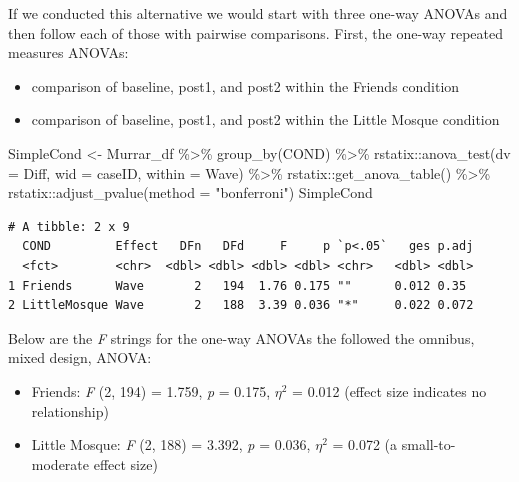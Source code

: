 \documentclass[
  11pt,
]{book}
\newenvironment{Shaded}{\begin{snugshade}}{\end{snugshade}}
\newcommand{\AttributeTok}[1]{\textcolor[rgb]{0.77,0.63,0.00}{#1}}
\newcommand{\FunctionTok}[1]{\textcolor[rgb]{0.00,0.00,0.00}{#1}}
\newcommand{\NormalTok}[1]{#1}
\newcommand{\OtherTok}[1]{\textcolor[rgb]{0.56,0.35,0.01}{#1}}
\newcommand{\SpecialCharTok}[1]{\textcolor[rgb]{0.00,0.00,0.00}{#1}}
\newcommand{\StringTok}[1]{\textcolor[rgb]{0.31,0.60,0.02}{#1}}
\providecommand{\tightlist}{%
  \setlength{\itemsep}{0pt}\setlength{\parskip}{0pt}}
\begin{document}
If we conducted this alternative we would start with three one-way ANOVAs and then follow each of those with pairwise comparisons. First, the one-way repeated measures ANOVAs:

\begin{itemize}
\tightlist
\item
  comparison of baseline, post1, and post2 within the Friends condition
\item
  comparison of baseline, post1, and post2 within the Little Mosque condition
\end{itemize}

\begin{Shaded}
\begin{Highlighting}[]
\NormalTok{SimpleCond }\OtherTok{\textless{}{-}}\NormalTok{ Murrar\_df }\SpecialCharTok{\%\textgreater{}\%}
    \FunctionTok{group\_by}\NormalTok{(COND) }\SpecialCharTok{\%\textgreater{}\%}
\NormalTok{    rstatix}\SpecialCharTok{::}\FunctionTok{anova\_test}\NormalTok{(}\AttributeTok{dv =}\NormalTok{ Diff, }\AttributeTok{wid =}\NormalTok{ caseID, }\AttributeTok{within =}\NormalTok{ Wave) }\SpecialCharTok{\%\textgreater{}\%}
\NormalTok{    rstatix}\SpecialCharTok{::}\FunctionTok{get\_anova\_table}\NormalTok{() }\SpecialCharTok{\%\textgreater{}\%}
\NormalTok{    rstatix}\SpecialCharTok{::}\FunctionTok{adjust\_pvalue}\NormalTok{(}\AttributeTok{method =} \StringTok{"bonferroni"}\NormalTok{)}
\NormalTok{SimpleCond}
\end{Highlighting}
\end{Shaded}

\begin{verbatim}
# A tibble: 2 x 9
  COND         Effect   DFn   DFd     F     p `p<.05`   ges p.adj
  <fct>        <chr>  <dbl> <dbl> <dbl> <dbl> <chr>   <dbl> <dbl>
1 Friends      Wave       2   194  1.76 0.175 ""      0.012 0.35 
2 LittleMosque Wave       2   188  3.39 0.036 "*"     0.022 0.072
\end{verbatim}

Below are the \emph{F} strings for the one-way ANOVAs the followed the omnibus, mixed design, ANOVA:

\begin{itemize}
\tightlist
\item
  Friends: \emph{F} (2, 194) = 1.759, \emph{p} = 0.175, \(\eta^{2}\) = 0.012 (effect size indicates no relationship)
\item
  Little Mosque: \emph{F} (2, 188) = 3.392, \emph{p} = 0.036, \(\eta^{2}\) = 0.072 (a small-to-moderate effect size)
\end{itemize}
\end{document}
